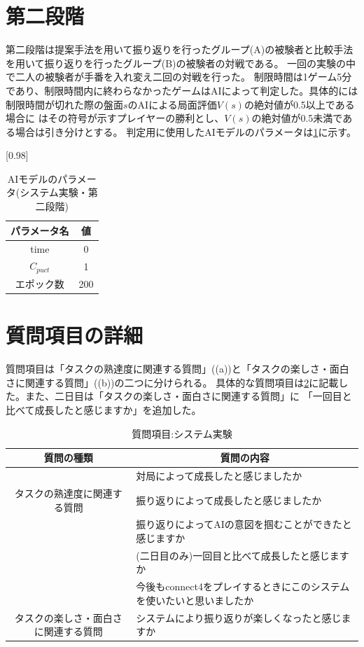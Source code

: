 \section{第二段階}
第二段階は提案手法を用いて振り返りを行ったグループ(A)の被験者と比較手法を用いて振り返りを行ったグループ(B)の被験者の対戦である。
一回の実験の中で二人の被験者が手番を入れ変え二回の対戦を行った。
制限時間は1ゲーム5分であり、制限時間内に終わらなかったゲームはAIによって判定した。具体的には制限時間が切れた際の盤面$s$のAIによる局面評価$V(s)$の絶対値が0.5以上である場合に
はその符号が示すプレイヤーの勝利とし、$V(s)$の絶対値が0.5未満である場合は引き分けとする。
判定用に使用したAIモデルのパラメータは\ref{table:param-judge}に示す。
\begin{table}[H]
	\caption{AIモデルのパラメータ(システム実験・第二段階)}
    \label{table:param-judge}
	\centering
	\scalebox{0.98}[0.98]{
		\begin{tabular}{c|c}
			パラメータ名 & 値 \\ \hline
			time    & 0\\ 
			$C_{puct}$    & 1 \\
            エポック数 & 200 \\
		\end{tabular}
	}
	
\end{table}


\section{質問項目の詳細}
質問項目は「タスクの熟達度に関連する質問」((a))と「タスクの楽しさ・面白さに関連する質問」((b))の二つに分けられる。
具体的な質問項目は\ref{table:query}に記載した。また、二日目は「タスクの楽しさ・面白さに関連する質問」に
「一回目と比べて成長したと感じますか」を追加した。
\begin{table}[H]
    \caption{質問項目:システム実験}
    \label{table:query}
	\scriptsize
    \begin{tabular}{c||l}
        \multicolumn{1}{c|}{質問の種類} & \multicolumn{1}{c}{質問の内容} \\ \hline \hline
        \multicolumn{1}{c||}{}&対局によって成長したと感じましたか \\
        タスクの熟達度に関連する質問 & 振り返りによって成長したと感じましたか \\
		\multicolumn{1}{c||}{}&振り返りによってAIの意図を掴むことができたと感じますか \\
		\multicolumn{1}{c||}{} & (二日目のみ)一回目と比べて成長したと感じますか\\\hline
        \multicolumn{1}{c||}{} & 今後もconnect4をプレイするときにこのシステムを使いたいと思いましたか \\
        タスクの楽しさ・面白さに関連する質問 & システムにより振り返りが楽しくなったと感じますか\\
    \end{tabular}
    
\end{table}
